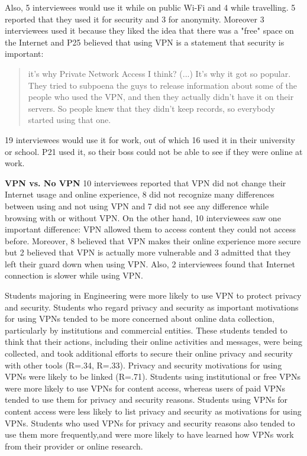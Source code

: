 Also, 5 interviewees would use it while on public Wi-Fi and 4 while
travelling. 5 reported that they used it for security and 3 for anonymity.
Moreover 3 interviewees used it because they liked the idea that there was a
"free" space on the Internet and P25 believed that using VPN is a statement
that security is important:

\begin{quote}it's why Private Network Access I think? (...) It's why it got so
popular. They tried to subpoena the guys to release information about some of
the people who used the VPN, and then they actually didn't have it on their
servers. So people knew that they didn't keep records, so everybody started
using that one. \end{quote}


19 interviewees would use it for work, out of which 16 used it in their
university or school. P21 used it, so their boss could not be able to see if
they were online at work.



\textbf{VPN vs. No VPN} 10 interviewees reported that VPN did not change their
Internet usage and online experience, 8 did not recognize many differences
between using and not using VPN and 7 did not see any difference while
browsing with or without VPN. On the other hand, 10 interviewees saw one
important difference: VPN allowed them to access content they could not access
before. Moreover, 8 believed that VPN makes their online experience more
secure but 2 believed that VPN is actually more vulnerable and 3 admitted that
they left their guard down when using VPN. Also, 2 interviewees found that
Internet connection is slower while using VPN.



Students majoring in Engineering were more likely to use VPN to protect
privacy and security. Students who regard privacy and security as important
motivations for using VPNs tended to be more concerned about online data
collection, particularly by institutions and commercial entities. These
students tended to think that their actions, including their online activities
and messages, were being collected, and took additional efforts to secure
their online privacy and security with other tools (R=.34, R=.33). Privacy and
security motivations for using VPNs were likely to be linked (R=.71). Students
using institutional or free VPNs were more likely to use VPNs for content
access, whereas users of paid VPNs tended to use them for privacy and security
reasons. Students using VPNs for content access were less likely to list
privacy and security as motivations for using VPNs. Students who used VPNs for
privacy and security reasons also tended to use them more frequently,and were
more likely to have learned how VPNs work from their provider or online
research. 

